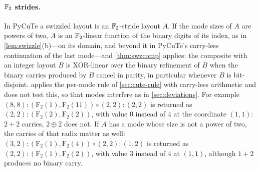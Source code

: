 \paragraph{$\mathbb{F}_2$ strides.}
In PyCuTe a swizzled layout is an $\mathbb{F}_2$-stride layout $A$. If the mode sizes of $A$ are powers
of two, $A$ is an $\mathbb{F}_2$-linear function of the binary digits of its index, as in
\cref{lem:swizzle}(b)---on its domain, and beyond it in PyCuTe's carry-less continuation of the
last mode---and \cref{thm:swzcomp} applies: the composite with an integer layout $B$
is XOR-linear over the binary refinement of $B$ when the binary carries produced by $B$ cancel in
parity, in particular whenever $B$ is bit-disjoint.  applies the per-mode
rule of \cref{sec:cute-rule} with carry-less arithmetic and does not test this, so that modes
interfere as in \cref{sec:deviations}. For example
$(8,8):(\mathrm{F}_2(1),\mathrm{F}_2(11))\circ(2,2):(2,2)$ is returned as
$(2,2):(\mathrm{F}_2(2),\mathrm{F}_2(2))$, with value $0$ instead of $4$ at the coordinate
$(1,1)$: $2+2$ carries, $2\oplus2$ does not. If $A$ has a mode whose size is not a power of two,
the carries of that radix matter as well:
$(3,2):(\mathrm{F}_2(1),\mathrm{F}_2(4))\circ(2,2):(1,2)$ is returned as
$(2,2):(\mathrm{F}_2(1),\mathrm{F}_2(2))$, with value $3$ instead of $4$ at $(1,1)$, although
$1+2$ produces no binary carry.
